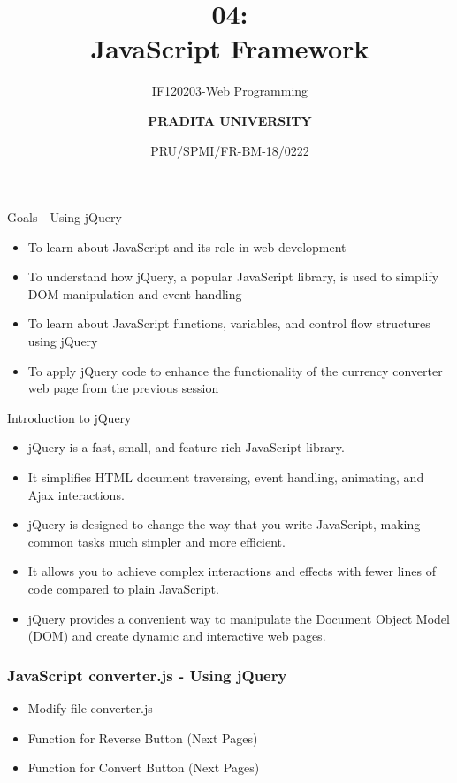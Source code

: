 \documentclass[aspectratio=169, table]{beamer}
\subtitle{IF120203-Web Programming}
\title{\Huge {\textbf{04: \\JavaScript Framework}}}
\date[Serial]{\scriptsize {PRU/SPMI/FR-BM-18/0222}}
\author[Pradita]{\small {\textbf{PRADITA UNIVERSITY}}}
\begin{document}
\begin{frame}
    \titlepage
\end{frame}

\begin{frame}{Goals - Using jQuery}
    \vskip-1cm
    \begin{itemize}
        \item To learn about JavaScript and its role in web development
        \item To understand how jQuery, a popular JavaScript library, is used to simplify DOM manipulation and event handling
        \item To learn about JavaScript functions, variables, and control flow structures using jQuery
        \item To apply jQuery code to enhance the functionality of the currency converter web page from the previous session
    \end{itemize}
\end{frame}

\begin{frame}{Introduction to jQuery}
    \vskip-0.5cm
    \begin{itemize}
        \item jQuery is a fast, small, and feature-rich JavaScript library.
        \item It simplifies HTML document traversing, event handling, animating, and Ajax interactions.
        \item jQuery is designed to change the way that you write JavaScript, making common tasks much simpler and more efficient.
        \item It allows you to achieve complex interactions and effects with fewer lines of code compared to plain JavaScript.
        \item jQuery provides a convenient way to manipulate the Document Object Model (DOM) and create dynamic and interactive web pages.
    \end{itemize}
\end{frame}



\begin{frame}[fragile]
    \frametitle{JavaScript converter.js - Using jQuery}
    \begin{itemize}
        \item Modify file converter.js
        \item Function for Reverse Button (Next Pages)
        \item Function for Convert Button (Next Pages)
    \end{itemize}
\end{frame}
\end{document}
